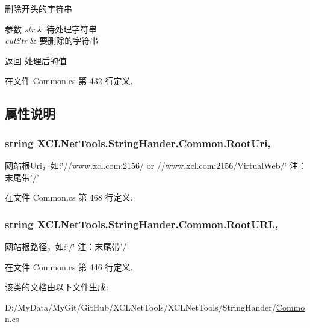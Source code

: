 删除开头的字符串 


\begin{DoxyParams}{参数}
{\em str} & 待处理字符串\\
\hline
{\em cut\-Str} & 要删除的字符串\\
\hline
\end{DoxyParams}
\begin{DoxyReturn}{返回}
处理后的值
\end{DoxyReturn}


在文件 Common.\-cs 第 432 行定义.



\subsection{属性说明}
\hypertarget{class_x_c_l_net_tools_1_1_string_hander_1_1_common_ae924e6a3e073efd4a75d53ea7095f976}{
\subsubsection[{Root\-Uri}]{\setlength{\rightskip}{0pt plus 5cm}string X\-C\-L\-Net\-Tools.\-String\-Hander.\-Common.\-Root\-Uri\hspace{0.3cm}{\ttfamily [static]}, {\ttfamily [get]}}}\label{class_x_c_l_net_tools_1_1_string_hander_1_1_common_ae924e6a3e073efd4a75d53ea7095f976}


网站根\-Uri，如\-:\char`\"{}//www.\-xcl.\-com\-:2156/ or //www.\-xcl.\-com\-:2156/\-Virtual\-Web/\char`\"{} 注：末尾带'/' 



在文件 Common.\-cs 第 468 行定义.

\hypertarget{class_x_c_l_net_tools_1_1_string_hander_1_1_common_a87e9775b7bdaaf9bc205a148b1335ee2}{
\subsubsection[{Root\-U\-R\-L}]{\setlength{\rightskip}{0pt plus 5cm}string X\-C\-L\-Net\-Tools.\-String\-Hander.\-Common.\-Root\-U\-R\-L\hspace{0.3cm}{\ttfamily [static]}, {\ttfamily [get]}}}\label{class_x_c_l_net_tools_1_1_string_hander_1_1_common_a87e9775b7bdaaf9bc205a148b1335ee2}


网站根路径，如\-:\char`\"{}/\char`\"{} 注：末尾带'/' 



在文件 Common.\-cs 第 446 行定义.



该类的文档由以下文件生成\-:\begin{DoxyCompactItemize}
\item 
D\-:/\-My\-Data/\-My\-Git/\-Git\-Hub/\-X\-C\-L\-Net\-Tools/\-X\-C\-L\-Net\-Tools/\-String\-Hander/\hyperlink{_common_8cs}{Common.\-cs}\end{DoxyCompactItemize}
